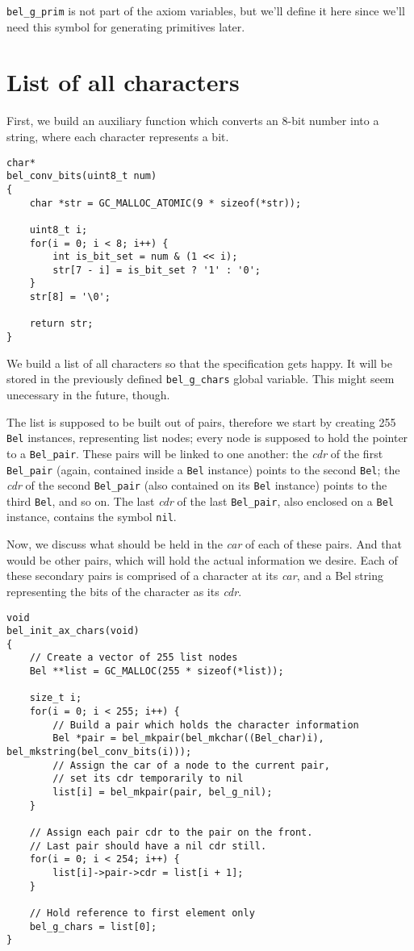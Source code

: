 \documentclass[openright,a4paper,twoside,12pt]{memoir}
\begin{document}
\texttt{bel\_g\_prim} is not part of the axiom variables, but we'll define it
here since we'll need this symbol for generating primitives later.

\section{List of all characters}
\label{sec:org034a7d5}

First, we build an auxiliary function which converts an 8-bit number
into a string, where each character represents a bit.

\begin{verbatim}
char*
bel_conv_bits(uint8_t num)
{
    char *str = GC_MALLOC_ATOMIC(9 * sizeof(*str));
    
    uint8_t i;
    for(i = 0; i < 8; i++) {
        int is_bit_set = num & (1 << i);
        str[7 - i] = is_bit_set ? '1' : '0';
    }
    str[8] = '\0';
    
    return str;
}
\end{verbatim}

We build a list of all characters so that the specification gets
happy. It will be stored in the previously defined \texttt{bel\_g\_chars} global
variable. This might seem unecessary in the future, though.

The list is supposed to be built out of pairs, therefore we start by
creating 255 \texttt{Bel} instances, representing list nodes; every node is
supposed to hold the pointer to a \texttt{Bel\_pair}. These pairs will be linked
to one another: the \emph{cdr} of the first \texttt{Bel\_pair} (again, contained inside
a \texttt{Bel} instance) points to the second \texttt{Bel}; the \emph{cdr} of the second
\texttt{Bel\_pair} (also contained on its \texttt{Bel} instance) points to the third \texttt{Bel},
and so on. The last \emph{cdr} of the last \texttt{Bel\_pair}, also enclosed on a \texttt{Bel}
instance, contains the symbol \texttt{nil}.

Now, we discuss what should be held in the \emph{car} of each of these
pairs. And that would be other pairs, which will hold the actual
information we desire. Each of these secondary pairs is comprised of a
character at its \emph{car}, and a Bel string representing the bits of the
character as its \emph{cdr}.

\begin{verbatim}
void
bel_init_ax_chars(void)
{
    // Create a vector of 255 list nodes
    Bel **list = GC_MALLOC(255 * sizeof(*list));

    size_t i;
    for(i = 0; i < 255; i++) {        
        // Build a pair which holds the character information
        Bel *pair = bel_mkpair(bel_mkchar((Bel_char)i), bel_mkstring(bel_conv_bits(i)));
        // Assign the car of a node to the current pair,
        // set its cdr temporarily to nil
        list[i] = bel_mkpair(pair, bel_g_nil);
    }

    // Assign each pair cdr to the pair on the front.
    // Last pair should have a nil cdr still.
    for(i = 0; i < 254; i++) {
        list[i]->pair->cdr = list[i + 1];
    }

    // Hold reference to first element only
    bel_g_chars = list[0];
}
\end{verbatim}
\end{document}
